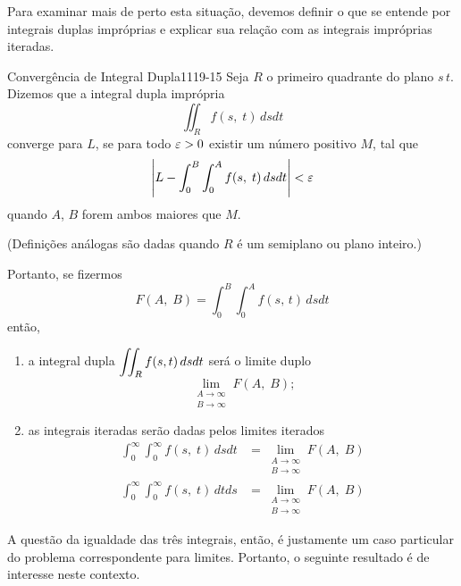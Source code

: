 Para examinar mais de perto esta situação, devemos definir o que
se entende por integrais duplas impróprias e explicar sua relação
com as integrais impróprias iteradas.

\begin{defic}{Convergência de Integral Dupla}{1119-15}
Seja $R$ o primeiro quadrante do plano $s\,t$. Dizemos que a
integral dupla imprópria
\begin{equation*}
  \iint_{R}f (s,\; t)\, dsdt
\end{equation*}
converge para $L$, se para todo $\varepsilon > 0$ existir um número
positivo $M$, tal que
\begin{equation*}
  \left|L -\int_0^B\int_0^A f(s,\; t)\, dsdt\right| < \varepsilon
\end{equation*}
quando $A$, $B$ forem ambos maiores que $M$.
\end{defic}

(Definições análogas são dadas quando $R$ é um semiplano ou plano
inteiro.)

Portanto, se fizermos
\begin{equation*}
  F(A,\; B)=\int_0^B\int_0^A f(s,\, t)\, dsdt
\end{equation*}
então,
\begin{enumerate}[label=(\alph*),leftmargin=1.5cm,ref=(\alph*)]
\item a integral dupla $\displaystyle{\iint_{R}f(s, t)\,dsdt}$ será o limite duplo
\begin{equation*}
  \lim_{\substack{A\to\infty\\B\to \infty}} F(A,\; B);
\end{equation*}
\item  as integrais iteradas serão dadas pelos
limites iterados
\begin{align*}
  \int_0^\infty\int_0^\infty f(s,\; t)\, dsdt &=\lim_{\substack{A\to\infty\\B\to \infty}}  F(A,\; B)\\[2ex]
  \int_0^\infty\int_0^\infty f(s,\; t)\, dtds&=\lim_{\substack{A\to\infty\\B\to \infty}}  F(A,\; B)
\end{align*}
\end{enumerate}

A questão da igualdade das três integrais, então, é justamente um
caso particular do problema correspondente para limites. Portanto,
o seguinte resultado é de interesse neste contexto.


